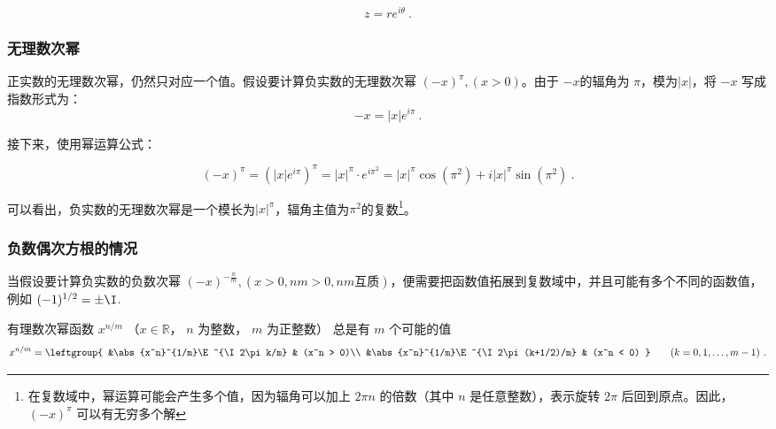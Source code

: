 \begin{equation}
z = r e^{i\theta}~.
\end{equation}

\subsubsection{无理数次幂}

正实数的无理数次幂，仍然只对应一个值。假设要计算负实数的无理数次幂 $(-x)^\pi,(x>0)$。由于 $-x$的辐角为 $\pi$，模为$|x|$，将 $-x$ 写成指数形式为：
\begin{equation}
-x = |x| e^{i\pi}~.
\end{equation}

接下来，使用幂运算公式：

\begin{equation}
(-x)^\pi = \left( |x| e^{i\pi} \right)^\pi =|x|^\pi \cdot e^{i\pi^2}=|x|^\pi\cos(\pi^2) + i|x|^\pi\sin(\pi^2)~.
\end{equation}

可以看出，负实数的无理数次幂是一个模长为$|x|^\pi$，辐角主值为$\pi^2$的复数\footnote{在复数域中，幂运算可能会产生多个值，因为辐角可以加上 $2\pi n$ 的倍数（其中 $n$ 是任意整数），表示旋转 $2\pi$ 后回到原点。因此，$(-x)^\pi$ 可以有无穷多个解}。

\subsubsection{负数偶次方根的情况}

当假设要计算负实数的负数次幂 $\displaystyle(-x)^{-\frac{n}{m}},(x>0,nm>0,nm\text{互质})$，便需要把函数值拓展到复数域中，并且可能有多个不同的函数值， 例如 $(-1)^{1/2} = \pm\I$. 

有理数次幂函数 $x^{n/m}$ （$x\in \mathbb R$， $n$ 为整数， $m$ 为正整数） 总是有 $m$ 个可能的值
\begin{equation}
x^{n/m} = \leftgroup{
&\abs{x^n}^{1/m}\E^{\I 2\pi k/m} & (x^n > 0)\\
&\abs{x^n}^{1/m}\E^{\I 2\pi (k+1/2)/m} & (x^n < 0)
}\qquad (k = 0,1,\dots, m-1)~.
\end{equation}
